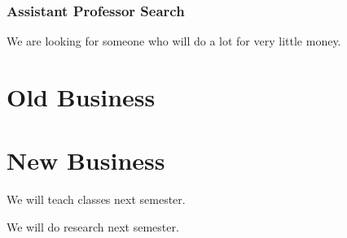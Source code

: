 \documentclass{article}
\begin{document}
\subsubsection{Assistant Professor Search}
We are looking for someone who will do a lot for very little money.

\section{Old Business}
\begin{items}
\item
\priormins
\end{items}

\section{New Business}
\begin{items}
\item
We will teach classes next semester.

\item
We will do research next semester.
\end{items}

\vspace{1em}
\end{document}
